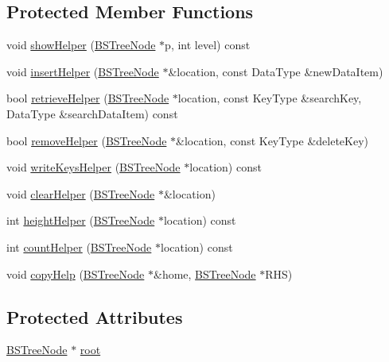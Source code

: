 \subsection*{Protected Member Functions}
\begin{DoxyCompactItemize}
\item 
void \hyperlink{class_b_s_tree_a44b3002e3476eb410468a4b9aaaa73ef}{show\+Helper} (\hyperlink{class_b_s_tree_1_1_b_s_tree_node}{B\+S\+Tree\+Node} $\ast$p, int level) const 
\item 
void \hyperlink{class_b_s_tree_ac0f54ec6e60536aafa6e3130968e4858}{insert\+Helper} (\hyperlink{class_b_s_tree_1_1_b_s_tree_node}{B\+S\+Tree\+Node} $\ast$\&location, const Data\+Type \&new\+Data\+Item)
\item 
bool \hyperlink{class_b_s_tree_aae2944702e1c5fe498b8fd93a2c28dab}{retrieve\+Helper} (\hyperlink{class_b_s_tree_1_1_b_s_tree_node}{B\+S\+Tree\+Node} $\ast$location, const Key\+Type \&search\+Key, Data\+Type \&search\+Data\+Item) const 
\item 
bool \hyperlink{class_b_s_tree_a11efb310116399fde0c83c6991a37f7d}{remove\+Helper} (\hyperlink{class_b_s_tree_1_1_b_s_tree_node}{B\+S\+Tree\+Node} $\ast$\&location, const Key\+Type \&delete\+Key)
\item 
void \hyperlink{class_b_s_tree_a36adcef767ab5a35a9de275aef841d9c}{write\+Keys\+Helper} (\hyperlink{class_b_s_tree_1_1_b_s_tree_node}{B\+S\+Tree\+Node} $\ast$location) const 
\item 
void \hyperlink{class_b_s_tree_a686803ea42d32427487652d229353846}{clear\+Helper} (\hyperlink{class_b_s_tree_1_1_b_s_tree_node}{B\+S\+Tree\+Node} $\ast$\&location)
\item 
int \hyperlink{class_b_s_tree_a7fef36c2ff90833730980767afbe3735}{height\+Helper} (\hyperlink{class_b_s_tree_1_1_b_s_tree_node}{B\+S\+Tree\+Node} $\ast$location) const 
\item 
int \hyperlink{class_b_s_tree_aad81734b14dcf5a934965b54391e4f7a}{count\+Helper} (\hyperlink{class_b_s_tree_1_1_b_s_tree_node}{B\+S\+Tree\+Node} $\ast$location) const 
\item 
void \hyperlink{class_b_s_tree_aa38d3e51bdc88701cc2db1913c3b6065}{copy\+Help} (\hyperlink{class_b_s_tree_1_1_b_s_tree_node}{B\+S\+Tree\+Node} $\ast$\&home, \hyperlink{class_b_s_tree_1_1_b_s_tree_node}{B\+S\+Tree\+Node} $\ast$R\+H\+S)
\end{DoxyCompactItemize}
\subsection*{Protected Attributes}
\begin{DoxyCompactItemize}
\item 
\hyperlink{class_b_s_tree_1_1_b_s_tree_node}{B\+S\+Tree\+Node} $\ast$ \hyperlink{class_b_s_tree_a83534afce9094181ac031f9f596a8625}{root}
\end{DoxyCompactItemize}


